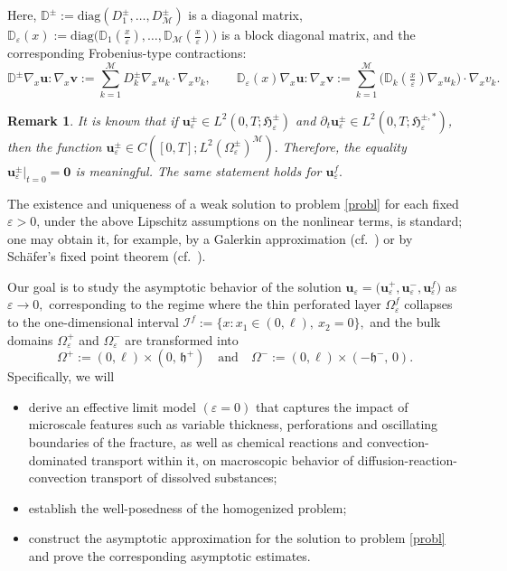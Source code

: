 \documentclass[reqno]{amsart}            %
\newtheorem{remark}{Remark}[section]
\numberwithin{equation}{section}
\begin{document}
	Here,  $\mathbb{D}^\pm := \mathrm{diag}(D^\pm_1,\ldots,D^\pm_\mathcal{M})$ is a diagonal matrix,
	$\mathbb{D}_\varepsilon(x) :=\mathrm{diag}\bigl(\mathbb{D}_1(\tfrac{x}{\varepsilon}),\dots,\mathbb{D}_{\mathcal{M}}(\tfrac{x}{\varepsilon})\bigr)
	$
	is a block diagonal matrix, and the corresponding Frobenius-type contractions:
	$$
	\mathbb{D}^\pm\nabla_x\mathbf{u} : \nabla_x\mathbf{v} := \sum_{k=1}^{\mathcal{M}} D^\pm_k\nabla_x u_k \cdot \nabla_x v_k ,
	\qquad
	\mathbb{D}_\varepsilon(x)\nabla_x\mathbf{u}:\nabla_x\mathbf{v} := \sum_{k=1}^{\mathcal{M}} \bigl(\mathbb{D}_k(\tfrac{x}{\varepsilon})\nabla_x u_k\bigr) \cdot \nabla_x v_k . 	
	$$
	\begin{remark}
		It is known that if 
		$\mathbf{u}^\pm_\varepsilon \in L^2(0,T; \boldsymbol{\mathfrak{H}}^{\pm}_\varepsilon)$ and $\partial_t \mathbf{u}^\pm_\varepsilon \in L^2(0,T; \boldsymbol{\mathfrak{H}}^{\pm, *}_\varepsilon)$, then the function $\mathbf{u}^\pm_\varepsilon \in C([0,T]; L^2(\Omega^{\pm}_\varepsilon)^\mathcal{M}).$ Therefore,
		the equality $\mathbf{u}^\pm_\varepsilon|_{t=0}=\mathbf{0}$ is meaningful. The same statement holds for $\mathbf{u}^f_\varepsilon.$
	\end{remark}
	
	The existence and uniqueness of a weak solution to problem \eqref{probl} for each fixed $\varepsilon>0$, under the above Lipschitz assumptions on the nonlinear terms, is standard; one may obtain it, for example, by a Galerkin approximation (cf.\ \cite[Sect.~3]{Mel-Roh_Non-Diff-2024}) or by Sch\"afer's fixed point theorem (cf.\ \cite[Prop.~1]{Gahn-Radu-2018}).
	
	\medskip
	
	Our goal is to  study the asymptotic behavior of the solution $\mathbf{u}_\varepsilon = \big(\mathbf{u}^+_\varepsilon, \mathbf{u}^-_\varepsilon, \mathbf{u}^f_\varepsilon \big)$ as
	$\varepsilon \to 0,$ corresponding to the regime where the thin perforated layer $\Omega^f_\varepsilon$ collapses to the one-dimensional interval
	$\mathcal{I}^f := \{x\colon x_1\in (0, \ell),\ x_2 =0\},$ and
	the bulk domains $\Omega^+_\varepsilon$ and $\Omega^-_\varepsilon$ are transformed into
	$$
	\Omega^+ := (0, \ell)\times(0, \, \mathfrak{h}^+) \quad \text{and} \quad \Omega^- := (0, \ell)\times(-\mathfrak{h}^-, \, 0).
	$$
	Specifically, we  will  
	\begin{itemize}
		\item
		derive an effective limit model $(\varepsilon = 0)$ that 
		captures the impact of microscale features such as variable thickness, perforations and oscillating boundaries of the fracture,
		as well as chemical reactions and convection-dominated transport within it, on macroscopic behavior of diffusion-reaction-convection transport of dissolved substances;
		\item
		establish the well-posedness of the homogenized problem;
		\item
		construct the asymptotic approximation for the solution to  problem \eqref{probl} and prove the corresponding asymptotic estimates.
	\end{itemize}
	
\end{document}
